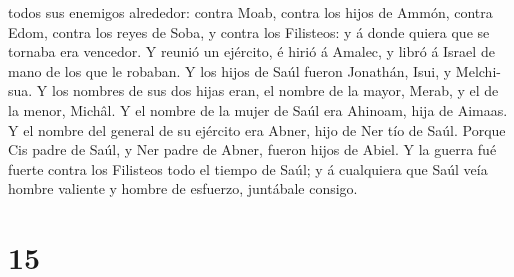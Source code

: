 todos sus enemigos alrededor: contra Moab, contra los hijos de Ammón,
contra Edom, contra los reyes de Soba, y contra los Filisteos: y á donde
quiera que se tornaba era vencedor.  Y reunió un
ejército, é hirió á Amalec, y libró á Israel de mano de los que le
robaban.  Y los hijos de Saúl fueron Jonathán, Isui, y
Melchi-sua. Y los nombres de sus dos hijas eran, el nombre de la mayor,
Merab, y el de la menor, Michâl.  Y el nombre de la mujer
de Saúl era Ahinoam, hija de Aimaas. Y el nombre del general de su
ejército era Abner, hijo de Ner tío de Saúl.  Porque Cis
padre de Saúl, y Ner padre de Abner, fueron hijos de Abiel.
 Y la guerra fué fuerte contra los Filisteos todo el
tiempo de Saúl; y á cualquiera que Saúl veía hombre valiente y hombre de
esfuerzo, juntábale consigo.

\hypertarget{section-14}{%
\section{15}\label{section-14}}

